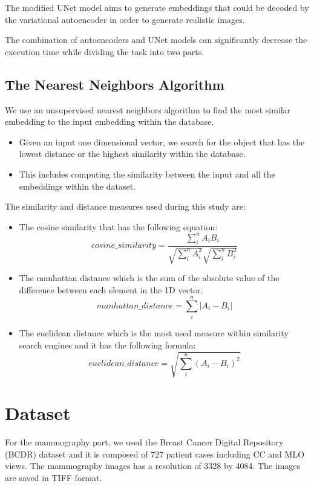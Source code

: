 \documentclass[11pt]{article}
\begin{document}
The modified UNet model aims to generate embeddings that could be decoded by the variational autoencoder in order to generate realistic images.

The combination of autoencoders and UNet models can significantly decrease the execution time while dividing the task into two parts.

\subsection{The Nearest Neighbors Algorithm}
We use an unsupervised nearest neighbors algorithm to find the most similar embedding to the input embedding within the database.

\begin{itemize}
  \item Given an input one dimensional vector, we search for the object that has the lowest distance or the highest similarity within the database.
  \item This includes computing the similarity between the input and all the embeddings within the dataset. 
\end{itemize}

The similarity and distance measures used during this study are:
\begin{itemize}
  \item The cosine similarity that has the following equation: 
  \begin{equation}
    cosine\_similarity = \frac{\sum_i^{n}  A_i B_i}{\sqrt{\sum_i^{n}  A_i^2} \sqrt{\sum_i^{n}  B_i^2}}
  \end{equation}
  \item The manhattan distance which is the sum of the absolute value of the difference between each element in the 1D vector.
  \begin{equation}
    manhattan\_distance = \sum_i^{n} |A_i - B_i|
  \end{equation}
  \item The euclidean distance which is the most used measure within similarity search engines and it has the following formula:
  \begin{equation}
    euclidean\_distance = \sqrt{ \sum_i^{n} { (A_i - B_i)^2}}
  \end{equation}
\end{itemize}


\section{Dataset}
For the mammography part, we used the Breast Cancer Digital Repository (BCDR) \cite{BCDR} dataset and it is composed of 727 patient cases including CC and MLO views. The mammography images has a resolution of 3328 by 4084. The images are saved in TIFF format.
\end{document}
